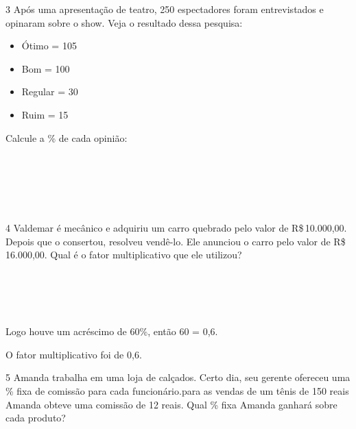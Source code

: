 \num{3} Após uma apresentação de teatro, 250 espectadores foram entrevistados
e opinaram sobre o show. Veja o resultado dessa pesquisa:

\begin{itemize}
\item
  Ótimo = 105
\item
  Bom = 100
\item
  Regular = 30
\item
  Ruim = 15
\end{itemize}

Calcule a \% de cada opinião:


\\

\\

\\

\\

\\

\num{4} Valdemar é mecânico e adquiriu um carro quebrado pelo valor de
R\$\,10.000,00. Depois que o consertou, resolveu vendê-lo. Ele anunciou o
carro pelo valor de R\$\,16.000,00. Qual é o fator multiplicativo que ele
utilizou?


\\

\\

\\

\\

Logo houve um acréscimo de 60\%, então 60  = 0,6.

O fator multiplicativo foi de 0,6.

\num{5} Amanda trabalha em uma loja de calçados. Certo dia, seu gerente
ofereceu uma \% fixa de comissão para cada funcionário.para as vendas de
um tênis de 150 reais Amanda obteve uma comissão de 12 reais. Qual \%
fixa Amanda ganhará sobre cada produto?


